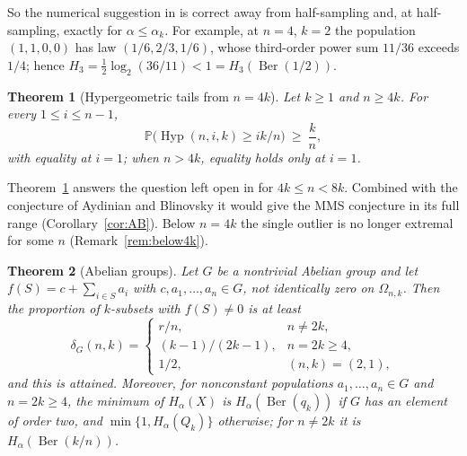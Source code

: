 \documentclass[11pt]{article}
\newtheorem{theorem}{Theorem}[section]
\theoremstyle{remark}
\newcommand{\Prb}{\mathbb P}
\newcommand{\Hyp}{\operatorname{Hyp}}
\newcommand{\Ber}{\operatorname{Ber}}
\begin{document}
So the numerical suggestion in \cite{AKP} is correct away from half-sampling
and, at half-sampling, exactly for \(\alpha\le\alpha_k\). For example, at
\(n=4\), \(k=2\) the population \((1,1,0,0)\) has law \((1/6,2/3,1/6)\),
whose third-order power sum \(11/36\) exceeds \(1/4\); hence
\(H_3=\tfrac12\log_2(36/11)<1=H_3(\Ber(1/2))\).

\begin{theorem}[Hypergeometric tails from \(n=4k\)]\label{thm:tail}
Let \(k\ge1\) and \(n\ge4k\). For every \(1\le i\le n-1\),
\[
 \Prb\bigl(\Hyp(n,i,k)\ge ik/n\bigr)\ \ge\ \frac kn ,
\]
with equality at \(i=1\); when \(n>4k\), equality holds only at \(i=1\).
\end{theorem}

Theorem~\ref{thm:tail} answers the question left open in \cite{AP} for
\(4k\le n<8k\). Combined with the conjecture of Aydinian and Blinovsky it would
give the MMS conjecture in its full range (Corollary~\ref{cor:AB}). Below
\(n=4k\) the single outlier is no longer extremal for some \(n\)
(Remark~\ref{rem:below4k}).

\begin{theorem}[Abelian groups]\label{thm:groups}
Let \(G\) be a nontrivial Abelian group and let
\(f(S)=c+\sum_{i\in S}a_i\) with \(c,a_1,\ldots,a_n\in G\), not identically
zero on \(\Omega_{n,k}\). Then the proportion of \(k\)-subsets with
\(f(S)\ne0\) is at least
\[
 \delta_G(n,k)=
 \begin{cases}
 r/n,&n\ne2k,\\
 (k-1)/(2k-1),&n=2k\ge4,\\
 1/2,&(n,k)=(2,1),
 \end{cases}
\]
and this is attained. Moreover, for nonconstant populations
\(a_1,\ldots,a_n\in G\) and \(n=2k\ge4\), the minimum of \(H_\alpha(X)\)
is \(H_\alpha(\Ber(q_k))\) if \(G\) has an element of order two, and
\(\min\{1,H_\alpha(Q_k)\}\) otherwise; for \(n\ne2k\) it is
\(H_\alpha(\Ber(k/n))\).
\end{theorem}
\end{document}
